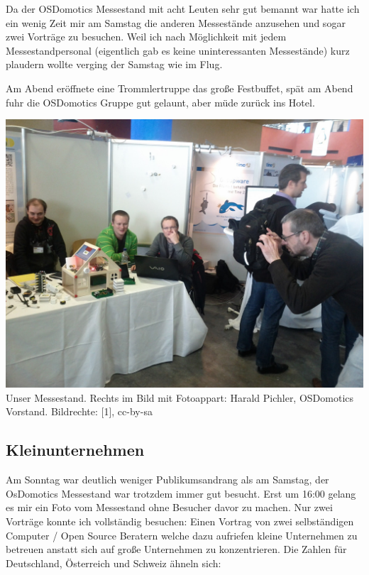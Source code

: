 \documentclass[10pt,a4paper,ngerman,twoside]{article} %
\begin{document}
\begin{multicols}{3}
Da der OSDomotics Messestand mit acht Leuten sehr gut bemannt war hatte ich ein wenig Zeit mir am Samstag die anderen Messestände anzusehen und sogar zwei Vorträge zu besuchen. Weil ich nach Möglichkeit mit jedem Messestandpersonal (eigentlich gab es keine uninteressanten Messestände) kurz plaudern wollte verging der Samstag wie im Flug. 

Am Abend eröffnete eine Trommlertruppe das große Festbuffet, spät am Abend fuhr die OSDomotics Gruppe gut gelaunt, aber müde zurück ins Hotel.

\begin{center}
\includegraphics[width=\linewidth]{chemnitz/chemnitz_puppenhaus.jpg}
\footnotesize{Unser Messestand. Rechts im Bild mit Fotoappart: Harald Pichler, OSDomotics Vorstand. Bildrechte: [1],  cc-by-sa}
\end{center}

\subsection*{Kleinunternehmen}

Am Sonntag war deutlich weniger Publikumsandrang als am Samstag, der OsDomotics Messestand war trotzdem immer gut besucht. Erst um 16:00 gelang es mir ein Foto vom Messestand ohne Besucher davor zu machen. Nur zwei Vorträge konnte ich vollständig besuchen: Einen Vortrag von zwei selbständigen Computer / Open Source Beratern welche dazu aufriefen kleine Unternehmen zu betreuen anstatt sich auf große Unternehmen zu konzentrieren. Die Zahlen für Deutschland, Österreich und Schweiz ähneln sich: 


\end{multicols}
\end{document}
